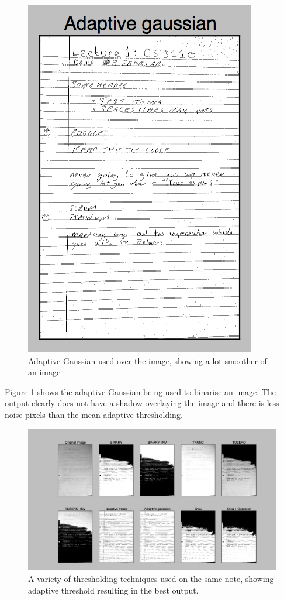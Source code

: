 \begin{figure}[H]
  \centering
  \includegraphics{images/adaptive_gaussian}
  \caption{Adaptive Gaussian used over the image, showing a lot smoother of an image}
  \label{fig:adaptive_gaussian}
\end{figure}

Figure \ref{fig:adaptive_gaussian} shows the adaptive Gaussian being used to binarise an image. The output clearly does not have a shadow overlaying the image and there is less noise pixels than the mean adaptive thresholding.

\begin{figure}[H]
  \centering
  \includegraphics[scale=0.3]{images/thresholding_options}
  \caption{A variety of thresholding techniques used on the same note, showing adaptive threshold resulting in the best output.}
  \label{fig:thresholding_options}
\end{figure}

